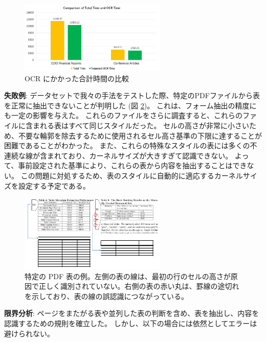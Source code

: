 \documentclass[uplatex, twocolumn,10pt]{jsarticle}
\begin{document}
\begin{figure}[tp]
    \begin{center}
        \includegraphics*[width=7cm]{image/master/master2/Fig6.png}
        \caption{OCR にかかった合計時間の比較}
        \label{fig6}
    \end{center}
\end{figure}

\textbf{失敗例}:
データセットで我々の手法をテストした際、特定のPDFファイルから表を正常に抽出できないことが判明した (図 \ref{fig7})。
これは、フォーム抽出の精度にも一定の影響を与えた。
これらのファイルをさらに調査すると、これらのファイルに含まれる表はすべて同じスタイルだった。
セルの高さが非常に小さいため、不要な輪郭を除去するために使用されるセル高さ基準の下限に達することが困難であることがわかった。
また、これらの特殊なスタイルの表には多くの不連続な線が含まれており、カーネルサイズが大きすぎて認識できない。
よって、事前設定された基準により、これらの表から内容を抽出することはできない。
この問題に対処するため、表のスタイルに自動的に適応するカーネルサイズを設定する予定である。

\begin{figure}[tp]
    \begin{center}
        \includegraphics*[width=7cm]{image/master/master2/Fig7.png}
        \caption{特定の PDF 表の例。左側の表の線は、最初の行のセルの高さが原因で正しく識別されていない。右側の表の赤い丸は、罫線の途切れを示しており、表の線の誤認識につながっている。}
        \label{fig7}
    \end{center}
\end{figure}

\textbf{限界分析}:
ページをまたがる表や並列した表の判断を含め、表を抽出し、内容を認識するための規則を確立した。
しかし、以下の場合には依然としてエラーは避けられない。
\end{document}
